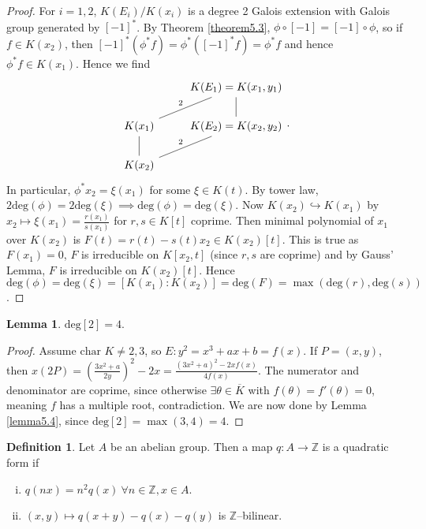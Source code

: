 \documentclass{article}
\theoremstyle{definition}
\newtheorem{lemma}[theorem]{Lemma}
\newtheorem{defn}{Definition}[section]
\begin{document}
\begin{proof}
    For $i=1,2$, $K(E_i)/K(x_i)$ is a degree 2 Galois extension with Galois group generated by $[-1]^*$. By Theorem \ref{theorem5.3}, $\phi \circ [-1] = [-1] \circ \phi$, so if $f \in K(x_2)$, then $[-1]^*(\phi^*f) = \phi^*([-1]^* f) = \phi^* f$ and hence $\phi^* f \in K(x_1)$. Hence we find
    $$\begin{tikzcd}[]
         & K(E_1) = K(x_1,y_1)\\
        K(x_1) & K(E_2) = K(x_2,y_2)\\
        K(x_2) &
        \arrow["2", from=2-1, to=1-2, dash]
        \arrow["2", from=3-1, to=2-2, dash]
        \arrow["", from=2-1, to=3-1, dash]
        \arrow["", from=1-2, to=2-2, dash]
    \end{tikzcd}.$$
    In particular, $\phi^*x_2 = \xi(x_1)$ for some $\xi \in K(t)$. By tower law, $2 \text{deg}(\phi) = 2 \text{deg}(\xi) \implies \text{deg}(\phi) = \text{deg}(\xi)$. Now $K(x_2) \hookrightarrow K(x_1)$ by $x_2 \mapsto \xi(x_1) = \frac{r(x_1)}{s(x_1)}$ for $r,s \in K[t]$ coprime. Then minimal polynomial of $x_1$ over $K(x_2)$ is $F(t) =r(t) -s(t)x_2 \in K(x_2)[t]$. This is true as $F(x_1)=0$, $F$ is irreducible on $K[x_2,t]$ (since $r,s$ are coprime) and by Gauss' Lemma, $F$ is irreducible on $K(x_2)[t]$. Hence $\text{deg}(\phi) = \text{deg}(\xi) = [K(x_1):K(x_2)] = \text{deg}(F) = \max(\text{deg}(r),\text{deg}(s))$.
\end{proof}
\begin{lemma}
    $\text{deg}[2] = 4$.
\end{lemma}
\begin{proof}
    Assume $\text{char }K \neq 2,3$, so $E : y^2 = x^3+ax+b = f(x)$. If $P = (x,y)$, then $x(2P) = \left(\frac{3x^2+a}{2y}\right)^2-2x = \frac{(3x^2+a)^2-2xf(x)}{4f(x)}$. The numerator and denominator are coprime, since otherwise $\exists \theta \in \overline{K}$ with $f(\theta) = f'(\theta) = 0$, meaning $f$ has a multiple root, contradiction. We are now done by Lemma \ref{lemma5.4}, since $\text{deg}[2] = \max(3,4) = 4$.
\end{proof}
\begin{defn}
    Let $A$ be an abelian group. Then a map $q : A \to \mathbb{Z}$ is a quadratic form if
    \begin{enumerate}[(i)]
        \item $q(nx) = n^2q(x)~\forall n \in \mathbb{Z}, x \in A$.
        \item $(x,y) \mapsto q(x+y)-q(x)-q(y)$ is $\mathbb{Z}$--bilinear.
    \end{enumerate}
\end{defn}
\end{document}
